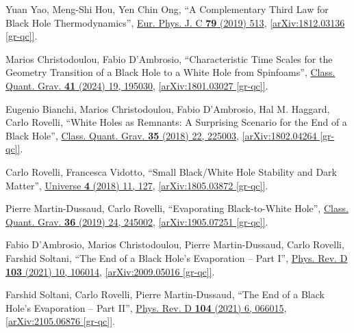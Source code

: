 \documentclass[12pt,preprintnumbers, floatfix, preprintnumbers, letterpaper, superscriptaddress,nofootinbib]{revtex4-2}
\begin{document}
\begin{thebibliography}{99}
Yuan Yao, Meng-Shi Hou, Yen Chin Ong, ``A Complementary Third Law for Black Hole Thermodynamics'', 	{\hypersetup{urlcolor=vividviolet}\href{https://link.springer.com/article/10.1140/epjc/s10052-019-7003-1}{Eur. Phys. J. C \textbf{79} (2019) 513}}, \href{https://arxiv.org/abs/1812.03136}{[arXiv:1812.03136 [gr-qc]]}.

Marios Christodoulou, Fabio D'Ambrosio, ``Characteristic Time Scales for the Geometry Transition of a Black Hole to a White Hole from Spinfoams'', {\hypersetup{urlcolor=vividviolet}\href{https://iopscience.iop.org/article/10.1088/1361-6382/ad6059}{Class. Quant. Grav. \textbf{41} (2024) 19, 195030}}, \href{https://arxiv.org/abs/1801.03027}{[arXiv:1801.03027 [gr-qc]]}.

Eugenio Bianchi, Marios Christodoulou, Fabio D'Ambrosio, Hal M. Haggard, Carlo Rovelli, ``White Holes as Remnants: A Surprising Scenario for the End of a Black Hole'', {\hypersetup{urlcolor=vividviolet}\href{https://iopscience.iop.org/article/10.1088/1361-6382/aae550}{Class. Quant. Grav. \textbf{35} (2018) 22, 225003}}, \href{https://arxiv.org/abs/1802.04264}{[arXiv:1802.04264 [gr-qc]]}.

Carlo Rovelli, Francesca Vidotto, ``Small Black/White Hole Stability and Dark Matter'', {\hypersetup{urlcolor=vividviolet}\href{https://www.mdpi.com/2218-1997/4/11/127}{Universe \textbf{4} (2018) 11, 127}}, \href{https://arxiv.org/abs/1805.03872}{[arXiv:1805.03872 [gr-qc]]}.

Pierre Martin-Dussaud, Carlo Rovelli, ``Evaporating Black-to-White Hole'', {\hypersetup{urlcolor=vividviolet}\href{https://iopscience.iop.org/article/10.1088/1361-6382/ab5097}{Class. Quant. Grav. \textbf{36} (2019) 24, 245002}}, \href{https://arxiv.org/abs/1905.07251}{[arXiv:1905.07251 [gr-qc]]}.

Fabio D'Ambrosio, Marios Christodoulou, Pierre Martin-Dussaud, Carlo Rovelli, Farshid Soltani, ``The End of a Black Hole's Evaporation -- Part I'', {\hypersetup{urlcolor=vividviolet}\href{https://journals.aps.org/prd/abstract/10.1103/PhysRevD.103.106014}{Phys. Rev. D \textbf{103} (2021) 10, 106014}}, \href{https://arxiv.org/abs/2009.05016}{[arXiv:2009.05016 [gr-qc]]}.

Farshid Soltani, Carlo Rovelli, Pierre Martin-Dussaud, ``The End of a Black Hole's Evaporation -- Part II'', {\hypersetup{urlcolor=vividviolet}\href{https://journals.aps.org/prd/abstract/10.1103/PhysRevD.104.066015}{Phys. Rev. D \textbf{104} (2021) 6, 066015}}, \href{https://arxiv.org/abs/2105.06876}{[arXiv:2105.06876 [gr-qc]]}.


\end{thebibliography}
\end{document}
